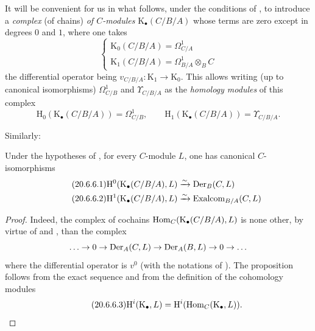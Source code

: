 \begin{env}[20.6.5]
\label{0.20.6.5}
It will be convenient for us in what follows, under the conditions of , to introduce a \emph{complex} (of chains) \emph{of $C$-modules} $\mathrm{K}_\bullet(C/B/A)$ whose terms are zero except in degrees $0$ and $1$, where one takes
\begin{equation}
\tag{20.6.5.1}
  \label{0.20.6.5.1}
  \begin{cases}
  \mathrm{K}_0(C/B/A)=\Omega^1_{C/A} \\
  \mathrm{K}_1(C/B/A)=\Omega^1_{B/A}\otimes_B C
  \end{cases}
\end{equation}
the differential operator being $v_{C/B/A}:\mathrm{K}_1\to\mathrm{K}_0$.
This allows writing (up to canonical isomorphisms) $\Omega^1_{C/B}$ and $\Upsilon_{C/B/A}$ as the \emph{homology modules} of this complex
\begin{equation}
\tag{20.6.5.2}
  \label{0.20.6.5.2}
  \mathrm{H}_0(\mathrm{K}_\bullet(C/B/A))=\Omega^1_{C/B},\qquad \mathrm{H}_1(\mathrm{K}_\bullet(C/B/A))=\Upsilon_{C/B/A}.
\end{equation}
\end{env}

Similarly:
\begin{proposition}[20.6.6]
\label{0.20.6.6}
Under the hypotheses of , for every $C$-module $L$, one has canonical $C$-isomorphisms
\begin{align}
\tag{20.6.6.1}
  \label{0.20.6.6.1}
  \mathrm{H}^0(\mathrm{K}_\bullet(C/B/A),L) &\xrightarrow{\sim}\operatorname{Der}_B(C,L) \\
\tag{20.6.6.2}
  \label{0.20.6.6.2}
  \mathrm{H}^1(\mathrm{K}_\bullet(C/B/A),L) &\xrightarrow{\sim}\operatorname{Exalcom}_{B/A}(C,L)
\end{align}
\end{proposition}

\begin{proof}
Indeed, the complex of cochains $\operatorname{Hom}_C(\mathrm{K}_\bullet(C/B/A),L)$ is none other, by virtue of  and , than the complex
\[
  \ldots\to 0\to\operatorname{Der}_A(C,L)\to\operatorname{Der}_A(B,L)\to 0\to\ldots
\]
where the differential operator is $v^0$ (with the notations of ).
The proposition follows from the exact sequence  and from the definition of the cohomology modules
\begin{equation}
\tag{20.6.6.3}
  \label{0.20.6.6.3}
  \mathrm{H}^i(\mathrm{K}_\bullet,L)=\mathrm{H}^i(\operatorname{Hom}_C(\mathrm{K}_\bullet,L)).
\end{equation}
\end{proof}

